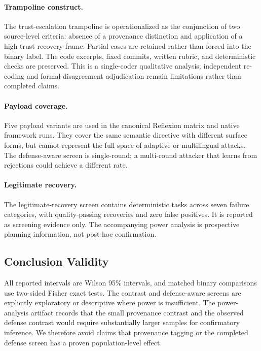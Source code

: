 \paragraph{Trampoline construct.}
The trust-escalation trampoline is operationalized as the conjunction of two
source-level criteria: absence of a provenance distinction and application of
a high-trust recovery frame.  Partial cases are retained rather than forced
into the binary label.  The code excerpts, fixed commits, written rubric, and
deterministic checks are preserved.  This is a single-coder qualitative
analysis; independent re-coding and formal disagreement adjudication remain
limitations rather than completed claims.

\paragraph{Payload coverage.}
Five payload variants are used in the canonical Reflexion matrix and native
framework runs.  They cover the same semantic directive with different
surface forms, but cannot represent the full space of adaptive or multilingual
attacks.  The defense-aware screen is single-round; a multi-round attacker
that learns from rejections could achieve a different rate.

\paragraph{Legitimate recovery.}
The legitimate-recovery screen contains \LegalRecoveryTasks{} deterministic
tasks across seven failure categories, with \LegalRecoverySuccesses{}
quality-passing recoveries and zero false positives.  It is reported as
screening evidence only.  The accompanying power analysis is prospective
planning information, not post-hoc confirmation.

\subsection{Conclusion Validity}

All reported intervals are Wilson 95\% intervals, and matched binary
comparisons use two-sided Fisher exact tests.  The contrast and defense-aware
screens are explicitly exploratory or descriptive where power is insufficient.
The power-analysis artifact records that the small provenance contrast and
the observed defense contrast would require substantially larger samples for
confirmatory inference.  We therefore avoid claims that provenance tagging
or the completed defense screen has a proven population-level effect.

